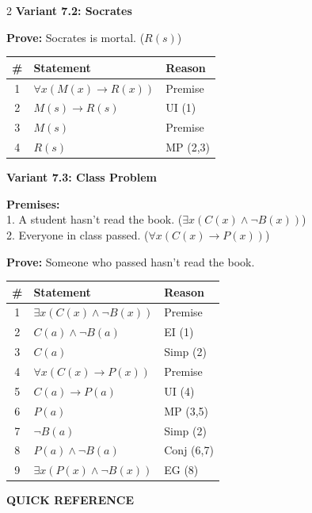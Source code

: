 \documentclass[8pt,a4paper]{article}
\newenvironment{exbox}[1][]{\vspace{2pt}\noindent\textbf{#1}\par\smallskip}{\vspace{2pt}}
\newenvironment{solbox}{\vspace{2pt}\begin{leftbar}}{\end{leftbar}\vspace{2pt}}
\begin{document}
\begin{multicols}{2}
\begin{exbox}[Variant 7.2: Socrates]
\textbf{Prove:} Socrates is mortal. ($R(s)$)

\begin{solbox}
\begin{tabular}{c|l|l}
\# & Statement & Reason \\
\hline
1 & $\forall x(M(x) \to R(x))$ & Premise \\
2 & $M(s) \to R(s)$ & UI (1) \\
3 & $M(s)$ & Premise \\
4 & $R(s)$ & MP (2,3) \\
\end{tabular}
\end{solbox}
\end{exbox}

\begin{exbox}[Variant 7.3: Class Problem]
\textbf{Premises:}\\
1. A student hasn't read the book. ($\exists x(C(x) \land \neg B(x))$)\\
2. Everyone in class passed. ($\forall x(C(x) \to P(x))$)

\textbf{Prove:} Someone who passed hasn't read the book.

\begin{solbox}
\begin{tabular}{c|l|l}
\# & Statement & Reason \\
\hline
1 & $\exists x(C(x) \land \neg B(x))$ & Premise \\
2 & $C(a) \land \neg B(a)$ & EI (1) \\
3 & $C(a)$ & Simp (2) \\
4 & $\forall x(C(x) \to P(x))$ & Premise \\
5 & $C(a) \to P(a)$ & UI (4) \\
6 & $P(a)$ & MP (3,5) \\
7 & $\neg B(a)$ & Simp (2) \\
8 & $P(a) \land \neg B(a)$ & Conj (6,7) \\
9 & $\exists x(P(x) \land \neg B(x))$ & EG (8) \\
\end{tabular}
\end{solbox}
\end{exbox}

\end{multicols}

\newpage

\begin{center}
{\large\bfseries QUICK REFERENCE}
\end{center}
\end{document}
